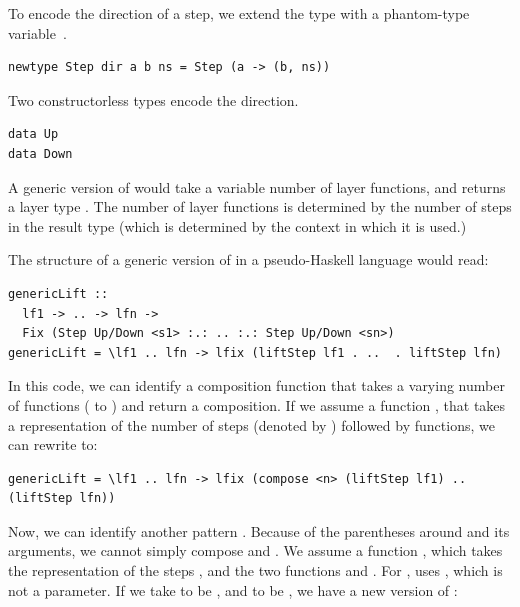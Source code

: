 \documentclass{llncs}
\begin{document}
To encode the direction of a step, we extend the  type with a phantom-type variable~\cite{leijen99dsecs}.

\begin{small}
\begin{verbatim}
newtype Step dir a b ns = Step (a -> (b, ns))
\end{verbatim}
\end{small}

Two constructorless types encode the direction.

\begin{small}
\begin{verbatim}
data Up 
data Down 
\end{verbatim}
\end{small}




A generic version of  would take a variable number of layer functions, and returns a layer type . The number of layer functions is determined by the number of steps in the result type (which is determined by the context in which it is used.)

The structure of a generic version of  in a pseudo-Haskell language would read:

\begin{small}
\begin{verbatim}
genericLift :: 
  lf1 -> .. -> lfn ->
  Fix (Step Up/Down <s1> :.: .. :.: Step Up/Down <sn>)
genericLift = \lf1 .. lfn -> lfix (liftStep lf1 . ..  . liftStep lfn)
\end{verbatim}%
\end{small}

In this code, we can identify a composition function that takes a varying number of functions ( to ) and return a composition. If we assume a function , that takes a representation of the number of steps (denoted by ) followed by  functions, we can rewrite  to:

\begin{small}
\begin{verbatim}
genericLift = \lf1 .. lfn -> lfix (compose <n> (liftStep lf1) .. (liftStep lfn))
\end{verbatim}%
\end{small}

Now, we can identify another pattern . Because of the parentheses around  and its arguments, we cannot simply compose  and . We assume a function , which takes the representation of the steps , and the two functions  and . For ,  uses , which is not a parameter. If we take  to be , and  to be , we have a new version of :
\end{document}
